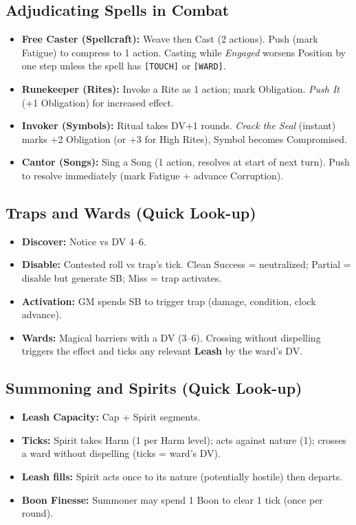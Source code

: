 \subsection{Adjudicating Spells in Combat}
\begin{itemize}[leftmargin=*]
  \item \textbf{Free Caster (Spellcraft):} Weave then Cast (2 actions). Push (mark Fatigue) to compress to 1 action. Casting while \textit{Engaged} worsens Position by one step unless the spell has \texttt{[TOUCH]} or \texttt{[WARD]}.
  \item \textbf{Runekeeper (Rites):} Invoke a Rite as 1 action; mark Obligation. \textit{Push It} (+1 Obligation) for increased effect.
  \item \textbf{Invoker (Symbols):} Ritual takes DV+1 rounds. \textit{Crack the Seal} (instant) marks +2 Obligation (or +3 for High Rites), Symbol becomes Compromised.
  \item \textbf{Cantor (Songs):} Sing a Song (1 action, resolves at start of next turn). Push to resolve immediately (mark Fatigue + advance Corruption).
\end{itemize}

\subsection{Traps and Wards (Quick Look-up)}
\begin{itemize}[leftmargin=*]
  \item \textbf{Discover:} Notice vs DV 4--6.
  \item \textbf{Disable:} Contested roll vs trap's tick. Clean Success = neutralized; Partial = disable but generate SB; Miss = trap activates.
  \item \textbf{Activation:} GM spends SB to trigger trap (damage, condition, clock advance).
  \item \textbf{Wards:} Magical barriers with a DV (3--6). Crossing without dispelling triggers the effect and ticks any relevant \textbf{Leash} by the ward's DV.
\end{itemize}

\subsection{Summoning and Spirits (Quick Look-up)}
\begin{itemize}[leftmargin=*]
  \item \textbf{Leash Capacity:} Cap + Spirit segments.
  \item \textbf{Ticks:} Spirit takes Harm (1 per Harm level); acts against nature (1); crosses a ward without dispelling (ticks = ward's DV).
  \item \textbf{Leash fills:} Spirit acts once to its nature (potentially hostile) then departs.
  \item \textbf{Boon Finesse:} Summoner may spend 1 Boon to clear 1 tick (once per round).
\end{itemize}

